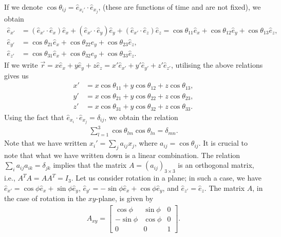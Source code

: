 If we denote $\cos \theta_{ij} = \hat{e}_{x_{i}'} \cdot \hat{e}_{x_{j}}$, (these are functions of time and are not fixed), we obtain
\begin{align}
    \hat{e}_{x'} &= (\hat{e}_{x'} \cdot \hat{e}_{x}) \hat{e}_{x} + (\hat{e}_{x'} \cdot \hat{e}_{y}) \hat{e}_{y} + (\hat{e}_{x'} \cdot \hat{e}_{z}) \hat{e}_{z} = \cos \theta_{11} \hat{e}_{x} + \cos \theta_{12} \hat{e}_{y} + \cos \theta_{13} \hat{e}_{z}, \\
    \hat{e}_{y'} &= \cos \theta_{21} \hat{e}_{x} + \cos \theta_{22} \hat{e}_{y} + \cos \theta_{23} \hat{e}_{z}, \\
    \hat{e}_{z'} &= \cos \theta_{31} \hat{e}_{x} + \cos \theta_{32} \hat{e}_{y} + \cos \theta_{33} \hat{e}_{z}.
\end{align}
If we write $\vec{r} = x \hat{e}_{x} + y \hat{e}_{y} + z \hat{e}_{z} = x' \hat{e}_{x'} + y' \hat{e}_{y'} + z' \hat{e}_{z'}$, utilising the above relations gives us
\begin{align}
    x' &= x \cos \theta_{11} + y \cos \theta_{12} + z \cos \theta_{13},\\
    y' &= x \cos \theta_{21} + y \cos \theta_{22} + z \cos \theta_{23},\\
    z' &= x \cos \theta_{31} + y \cos \theta_{32} + z \cos \theta_{33}.
\end{align}
Using the fact that $\hat{e}_{x_{i}} \cdot \hat{e}_{x_{j}} = \delta_{ij}$, we obtain the relation
\begin{align}
    \sum_{l=1}^{3} \cos \theta_{lm} \cos \theta_{ln} = \delta_{mn}.
\end{align}
Note that we have written $x_{i}' = \sum_{j} a_{ij} x_{j}$, where $a_{ij} = \cos \theta_{ij}$. It is crucial to note that what we have written down is a linear combination. The relation $\sum_{i} a_{ij} a_{ik} = \delta_{jk}$ implies that the matrix $A = (a_{ij})_{3 \times 3}$ is an orthogonal matrix, i.e., $A^{T}A = AA^{T} = I_{3}$. Let us consider rotation in a plane; in such a case, we have $\hat{e}_{x'} = \cos \phi \hat{e}_{x} + \sin \phi \hat{e}_{y}$, $\hat{e}_{y'} = -\sin \phi \hat{e}_{x} + \cos \phi \hat{e}_{y}$, and $\hat{e}_{z'} = \hat{e}_{z}$. The matrix $A$, in the case of rotation in the $xy$-plane, is given by
\begin{align}
    A_{xy} = \begin{bmatrix}
        \cos \phi & \sin \phi & 0 \\
        -\sin \phi & \cos \phi & 0 \\
        0 & 0 & 1
    \end{bmatrix}.
\end{align}
